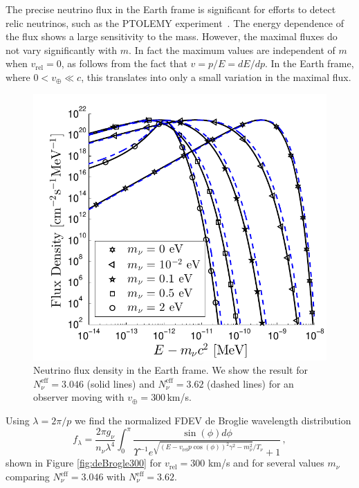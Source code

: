 The precise neutrino flux in the Earth frame is significant for efforts to detect relic neutrinos, such as the PTOLEMY experiment~\cite{Betts:2013uya}. The energy dependence of the flux shows a large sensitivity to the mass. However, the maximal fluxes do not vary significantly with $m$. In fact the maximum values are independent of $m$ when $v_{\text{rel}}=0$, as follows from the fact that $v=p/E=dE/dp$.  In the Earth frame, where $0<v_\oplus\ll c$, this translates into only a small variation in the maximal flux.

\begin{figure}
\centerline{\includegraphics[width=0.9\linewidth]{plots/flux_dist.pdf}}
\caption{Neutrino flux density in the Earth frame. We show the result for $N_\nu^{\mathrm{eff}}=3.046$ (solid lines) and $N_\nu^{\mathrm{eff}}=3.62$ (dashed lines) for an observer moving with $v_\oplus=300$\,km/s. }
\label{fig:fluxDist}
 \end{figure}

Using $\lambda=2\pi/p$ we find  the normalized FDEV de Broglie wavelength distribution
\begin{equation}
f_\lambda=\frac{ 2\pi g_\nu}{n_\nu\lambda^4}\!\!\int_0^\pi\!\!\! \!\frac{\sin(\phi) d\phi}{\Upsilon^{-1}e^{\sqrt{( E-v_{\text{rel}} p \cos(\phi))^2\gamma^2-m_\nu^2}/T_\nu}\!\!+\!1}\,,
\end{equation}
shown in Figure \ref{fig:deBrogle300} for $v_{\text{rel}}=300$ km/s and for several values $m_\nu$ comparing  $N_\nu^{\mathrm{eff}}=3.046$ with $N_\nu^{\mathrm{eff}}=3.62$. 

